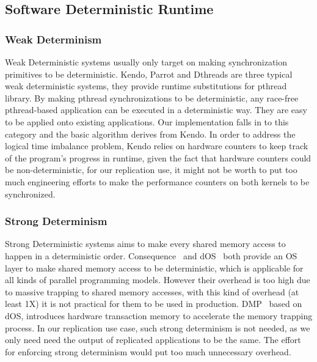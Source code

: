 \subsection{Software Deterministic Runtime}
\subsubsection{Weak Determinism}
Weak Deterministic systems usually only target on making synchronization primitives to be deterministic. Kendo\cite{olszewski2009kendo}, Parrot\cite{cui2013parrot} and Dthreads\cite{liu2011dthreads} are three typical weak deterministic systems, they provide runtime substitutions for pthread library. By making pthread synchronizations to be deterministic, any race-free pthread-based application can be executed in a deterministic way. They are easy to be applied onto existing applications. Our implementation falls in to this category and the basic algorithm derives from Kendo. In order to address the logical time imbalance problem, Kendo relies on hardware counters to keep track of the program's progress in runtime, given the fact that hardware counters could be non-deterministic\cite{weaver2008can}, for our replication use, it might not be worth to put too much engineering efforts to make the performance counters on both kernels to be synchronized.

\subsubsection{Strong Determinism}
Strong Deterministic systems aims to make every shared memory access to happen in a deterministic order. Consequence~\cite{merrifield2015high} and dOS~\cite{bergan2010deterministic} both provide an OS layer to make shared memory access to be deterministic, which is applicable for all kinds of parallel programming models. However their overhead is too high due to massive trapping to shared memory accesses, with this kind of overhead (at least 1X) it is not practical for them to be used in production. DMP~\cite{devietti2009dmp} based on dOS, introduces hardware transaction memory to accelerate the memory trapping process. In our replication use case, such strong determinism is not needed, as we only need need the output of replicated applications to be the same. The effort for enforcing strong determinism would put too much unnecessary overhead.

